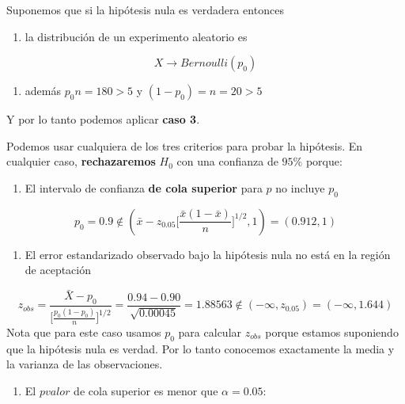 \documentclass[
]{book}
\providecommand{\tightlist}{%
  \setlength{\itemsep}{0pt}\setlength{\parskip}{0pt}}
\begin{document}
Suponemos que si la hipótesis nula es verdadera entonces

\begin{enumerate}
\def\labelenumi{\arabic{enumi}.}
\tightlist
\item
  la distribución de un experimento aleatorio es
\end{enumerate}

\[X \rightarrow Bernoulli (p_0)\]

\begin{enumerate}
\def\labelenumi{\arabic{enumi}.}
\setcounter{enumi}{1}
\tightlist
\item
  además \(p_0n=180>5\) y \((1-p_0)=n=20>5\)
\end{enumerate}

Y por lo tanto podemos aplicar \textbf{caso 3}.

Podemos usar cualquiera de los tres criterios para probar la hipótesis. En cualquier caso, \textbf{rechazaremos} \(H_0\) con una confianza de \(95\%\) porque:

\begin{enumerate}
\def\labelenumi{\arabic{enumi}.}
\tightlist
\item
  El intervalo de confianza \textbf{de cola superior} para \(p\) no incluye \(p_0\)
\end{enumerate}

\[p_0=0.9 \notin (\bar{x}-z_{0.05}\big[\frac{\bar{x}(1-\bar{x})}{n} \big]^{1/2},1)= (0.912,1)\]

\begin{enumerate}
\def\labelenumi{\arabic{enumi}.}
\setcounter{enumi}{1}
\tightlist
\item
  El error estandarizado observado bajo la hipótesis nula no está en la región de aceptación
\end{enumerate}

\[z_{obs}= \frac{\bar{X}-p_0}{\big[\frac{p_0(1-p_0)}{n} \big]^{1/2}} =\frac{0.94 -0.90}{\sqrt{0.00045}}=1.88563 \notin (-\infty, z_{0.05})=(-\infty, 1.644)\]
Nota que para este caso usamos \(p_0\) para calcular \(z_{obs}\) porque estamos suponiendo que la hipótesis nula es verdad. Por lo tanto conocemos exactamente la media y la varianza de las observaciones.

\begin{enumerate}
\def\labelenumi{\arabic{enumi}.}
\setcounter{enumi}{2}
\tightlist
\item
  El \(pvalor\) de cola superior es menor que \(\alpha=0.05\):
\end{enumerate}
\end{document}
